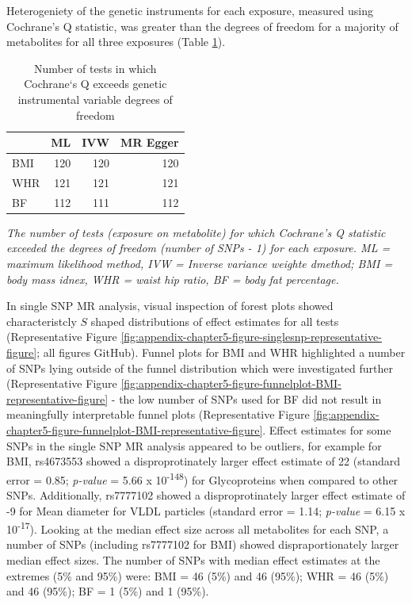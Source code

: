\documentclass[11pt,twoside]{bristolthesis}
\newcommand{\bsmall}{\begin{small}}
\newcommand{\esmall}{\end{small}}
\begin{document}
Heterogeniety of the genetic instruments for each exposure, measured using Cochrane's Q statistic, was greater than the degrees of freedom for a majority of metabolites for all three exposures (Table \ref{tab:chapter5-table-heterogeneity-N}).
\begin{table}

\caption{\label{tab:chapter5-table-heterogeneity-N}Number of tests in which Cochrane`s Q exceeds genetic instrumental variable degrees of freedom}
\centering
\begin{tabular}[t]{lrrr}
\toprule
 & ML & IVW & MR Egger\\
\midrule
BMI & 120 & 120 & 120\\
WHR & 121 & 121 & 121\\
BF & 112 & 111 & 112\\
\bottomrule
\end{tabular}
\end{table}
\noindent 
\bsmall
\emph{The number of tests (exposure on metabolite) for which Cochrane's Q statistic exceeded the degrees of freedom (number of SNPs - 1) for each exposure. ML = maximum likelihood method, IVW = Inverse variance weighte dmethod; BMI = body mass idnex, WHR = waist hip ratio, BF = body fat percentage.}
\esmall

In single SNP MR analysis, visual inspection of forest plots showed characteristcly \(S\) shaped distributions of effect estimates for all tests (Representative Figure \ref{fig:appendix-chapter5-figure-singlesnp-representative-figure}; all figures GitHub). Funnel plots for BMI and WHR highlighted a number of SNPs lying outside of the funnel distribution which were investigated further (Representative Figure \ref{fig:appendix-chapter5-figure-funnelplot-BMI-representative-figure} - the low number of SNPs used for BF did not result in meaningfully interpretable funnel plots (Representative Figure \ref{fig:appendix-chapter5-figure-funnelplot-BMI-representative-figure}. Effect estimates for some SNPs in the single SNP MR analysis appeared to be outliers, for example for BMI, rs4673553 showed a disproprotinately larger effect estimate of 22 (standard error = 0.85; \emph{p-value} = 5.66 x 10\textsuperscript{-148}) for Glycoproteins when compared to other SNPs. Additionally, rs7777102 showed a disproprotinately larger effect estimate of -9 for Mean diameter for VLDL particles (standard error = 1.14; \emph{p-value} = 6.15 x 10\textsuperscript{-17}). Looking at the median effect size across all metabolites for each SNP, a number of SNPs (including rs7777102 for BMI) showed dispraportionately larger median effect sizes. The number of SNPs with median effect estimates at the extremes (5\% and 95\%) were: BMI = 46 (5\%) and 46 (95\%); WHR = 46 (5\%) and 46 (95\%); BF = 1 (5\%) and 1 (95\%).
\end{document}
